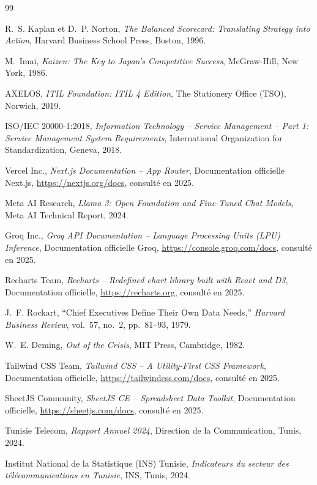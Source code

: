 \documentclass[11pt,a4paper]{report}
\begin{document}
\begin{thebibliography}{99}

R.~S. Kaplan et D.~P. Norton, \textit{The Balanced Scorecard: Translating Strategy into Action}, Harvard Business School Press, Boston, 1996.

M.~Imai, \textit{Kaizen: The Key to Japan's Competitive Success}, McGraw-Hill, New York, 1986.

AXELOS, \textit{ITIL Foundation: ITIL 4 Edition}, The Stationery Office (TSO), Norwich, 2019.

ISO/IEC 20000-1:2018, \textit{Information Technology -- Service Management -- Part 1: Service Management System Requirements}, International Organization for Standardization, Geneva, 2018.

Vercel Inc., \textit{Next.js Documentation -- App Router}, Documentation officielle Next.js, \url{https://nextjs.org/docs}, consulté en 2025.

Meta AI Research, \textit{Llama 3: Open Foundation and Fine-Tuned Chat Models}, Meta AI Technical Report, 2024.

Groq Inc., \textit{Groq API Documentation -- Language Processing Units (LPU) Inference}, Documentation officielle Groq, \url{https://console.groq.com/docs}, consulté en 2025.

Recharts Team, \textit{Recharts -- Redefined chart library built with React and D3}, Documentation officielle, \url{https://recharts.org}, consulté en 2025.

J.~F. Rockart, ``Chief Executives Define Their Own Data Needs,'' \textit{Harvard Business Review}, vol.~57, no.~2, pp.~81--93, 1979.

W.~E. Deming, \textit{Out of the Crisis}, MIT Press, Cambridge, 1982.

Tailwind CSS Team, \textit{Tailwind CSS -- A Utility-First CSS Framework}, Documentation officielle, \url{https://tailwindcss.com/docs}, consulté en 2025.

SheetJS Community, \textit{SheetJS CE -- Spreadsheet Data Toolkit}, Documentation officielle, \url{https://sheetjs.com/docs}, consulté en 2025.

Tunisie Telecom, \textit{Rapport Annuel 2024}, Direction de la Communication, Tunis, 2024.

Institut National de la Statistique (INS) Tunisie, \textit{Indicateurs du secteur des télécommunications en Tunisie}, INS, Tunis, 2024.

\end{thebibliography}
\end{document}

